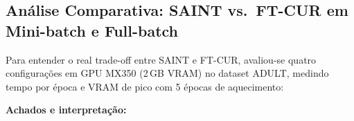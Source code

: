 \documentclass[12pt,a4paper]{article}
\begin{document}
\subsection{Análise Comparativa: SAINT vs.\ FT-CUR em Mini-batch e Full-batch}
\label{sec:saint_cur_minibatch}

Para entender o real trade-off entre SAINT e FT-CUR, avaliou-se quatro
configurações em GPU MX350 (2\,GB VRAM) no dataset ADULT, medindo tempo por
época e VRAM de pico com 5 épocas de aquecimento:

\begin{table}[H]
\centering
\caption{Tempo por época e VRAM de pico para quatro variantes de atenção
inter-instâncias. Hardware: NVIDIA MX350 (2\,GB). OOM = sem memória.
SAINT-mini: $B{=}1024$; FT-CUR-mini: $B{=}4096$, $m{=}10\%$ de $B$ fixo.}
\label{tab:saint_cur_4way}
\end{table}

\textbf{Achados e interpretação:}
\end{document}
